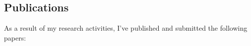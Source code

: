 \documentclass[runningheads]{llncs}
\begin{document}


\subsection{Publications}

As a result of my research activities,
I've published and submitted the following papers:
\end{document}
